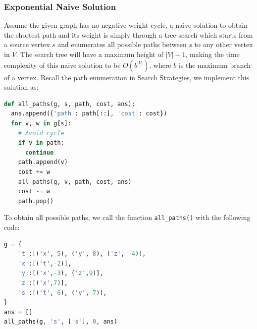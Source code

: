 \documentclass[../main.tex]{subfiles}
\begin{document}
\subsubsection{Exponential Naive Solution}
Assume the given graph has no negative-weight cycle, a naive solution to obtain the shortest path and its weight is simply through a tree-search which starts from a source vertex $s$ and enumerates all possible paths between $s$ to any other vertex in $V$. The search tree will have a maximum height of $|V|-1$, making the time complexity of this naive solution to be $O(b^{|V|})$, where $b$ is the maximum branch of a vertex. Recall the path enumeration in Search Strategies, we implement this solution as:
\begin{lstlisting}[language=Python]
def all_paths(g, s, path, cost, ans):
  ans.append({'path': path[::], 'cost': cost})
  for v, w in g[s]:
    # Avoid cycle
    if v in path:
      continue
    path.append(v)
    cost += w
    all_paths(g, v, path, cost, ans)
    cost -= w
    path.pop()
\end{lstlisting}
To obtain all possible paths, we call the function \texttt{all\_paths()} with the following code:
\begin{lstlisting}[language=Python]
g = {
    't':[('x', 5), ('y', 8), ('z', -4)],
    'x':[('t',-2)],
    'y':[('x',-3), ('z',9)],
    'z':[('x',7)],
    's':[('t', 6), ('y', 7)],   
}
ans = []
all_paths(g, 's', ['s'], 0, ans)
\end{lstlisting}
\end{document}
